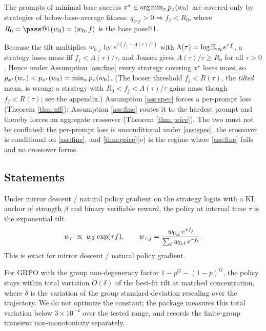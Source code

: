 \begin{assumption}
\label{ass:fine}
The prompts of minimal base success $x^\star\in\arg\min_x p_x(w_0)$ are covered
only by strategies of below-base-average fitness: $q_{x^\star j}>0\Rightarrow
f_j<R_0$, where $R_0=\pass@1(\wz)=\inner{\wz}{f}$ is the base pass@1.
\end{assumption}

Because the tilt multiplies $w_{0,j}$ by $e^{\tau(f_j-\Lambda(\tau)/\tau)}$ with
$\Lambda(\tau)=\log\mathbb{E}_{w_0}e^{\tau f}$, a strategy loses mass iff
$f_j<\Lambda(\tau)/\tau$, and Jensen gives $\Lambda(\tau)/\tau\ge R_0$ for all
$\tau>0$. Hence under Assumption \ref{ass:fine} every strategy covering $x^\star$
loses mass, so $p_{x^\star}(w_\tau)<p_{x^\star}(w_0)=\min_x p_x(w_0)$. (The looser
threshold $f_j<R(\tau)$, the \emph{tilted} mean, is wrong: a strategy with
$R_0<f_j<\Lambda(\tau)/\tau$ gains mass though $f_j<R(\tau)$; see the appendix.)
Assumption \ref{ass:spec} forces a per-prompt loss (Theorem \ref{thm:nfl});
Assumption \ref{ass:fine} routes it to the hardest prompt and thereby forces an
aggregate crossover (Theorem \ref{thm:price}). The two must not be conflated:
the per-prompt loss is unconditional under \ref{ass:spec}, the crossover is
conditional on \ref{ass:fine}, and \ref{thm:price}(e) is the regime where
\ref{ass:fine} fails and no crossover forms.

\subsection{Statements}

\begin{theorem}
\label{thm:tilt}
Under mirror descent / natural policy gradient on the strategy logits with a KL
anchor of strength $\beta$ and binary verifiable reward, the policy at internal
time $\tau$ is the exponential tilt
\begin{equation}
w_\tau \;\propto\; w_0\,\exp(\tau f),
\qquad
w_{\tau,j}=\frac{w_{0,j}\,e^{\tau f_j}}{\sum_{\ell}w_{0,\ell}\,e^{\tau f_\ell}} .
\end{equation}
This is exact for mirror descent / natural policy gradient.
\end{theorem}

\begin{proposition}
\label{prop:grpo}
For GRPO with the group non-degeneracy factor $1-p^G-(1-p)^G$, the policy stays
within total variation $O(\delta)$ of the best-fit tilt at matched concentration,
where $\delta$ is the variation of the group standard-deviation rescaling over the
trajectory. We do not optimize the constant; the package measures this total
variation below $3\times10^{-4}$ over the tested range, and records the
finite-group transient non-monotonicity separately.
\end{proposition}

